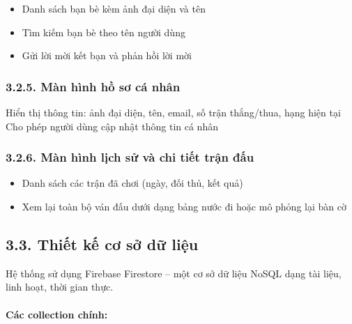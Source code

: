 \documentclass[a4paper,12pt]{article}
\begin{document}
\noindent \begin{itemize}[label=·]
    \item Danh sách bạn bè kèm ảnh đại diện và tên
    \item Tìm kiếm bạn bè theo tên người dùng
    \item Gửi lời mời kết bạn và phản hồi lời mời
\end{itemize}

\subsubsection*{3.2.5. Màn hình hồ sơ cá nhân} %

\noindent Hiển thị thông tin: ảnh đại diện, tên, email, số trận thắng/thua, hạng hiện tại
\noindent Cho phép người dùng cập nhật thông tin cá nhân

\subsubsection*{3.2.6. Màn hình lịch sử và chi tiết trận đấu} %

\noindent \begin{itemize}[label=·]
    \item Danh sách các trận đã chơi (ngày, đối thủ, kết quả)
    \item Xem lại toàn bộ ván đấu dưới dạng bảng nước đi hoặc mô phỏng lại bàn cờ
\end{itemize}

\subsection*{3.3. Thiết kế cơ sở dữ liệu} %

\justify
\noindent Hệ thống sử dụng Firebase Firestore – một cơ sở dữ liệu NoSQL dạng tài liệu, linh hoạt, thời gian thực.

\paragraph{Các collection chính:} %
\end{document}
